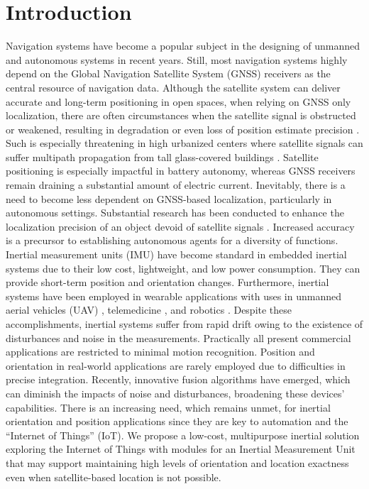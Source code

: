 \section{Introduction}
Navigation systems have become a popular subject in the designing of unmanned and autonomous systems in recent years. Still, most navigation systems highly depend on the Global Navigation Satellite System (GNSS) receivers as the central resource of navigation data. Although the satellite system can deliver accurate and long-term positioning in open spaces, when relying on GNSS only localization, there are often circumstances when the satellite signal is obstructed or weakened, resulting in degradation or even loss of position estimate precision \cite{ioannides2016known}. Such is especially threatening in high urbanized centers where satellite signals can suffer multipath propagation from tall glass-covered buildings \cite{omar2016integration}. Satellite positioning is especially impactful in battery autonomy, whereas GNSS receivers remain draining a substantial amount of electric current. Inevitably, there is a need to become less dependent on GNSS-based localization, particularly in autonomous settings. Substantial research has been conducted to enhance the localization precision of an object devoid of satellite signals \cite{nassar2004improving}\cite{dewhirst2016improving}\cite{kao1991integration}\cite{coyte2013displacement}\cite{wong1988high}. Increased accuracy is a precursor to establishing autonomous agents for a diversity of functions. Inertial measurement units (IMU) have become standard in embedded inertial systems due to their low cost, lightweight, and low power consumption. They can provide short-term position and orientation changes. Furthermore, inertial systems have been employed in wearable applications with uses in unmanned aerial vehicles (UAV) \cite{hetenyi2016sensor}\cite{luo2013uav}\cite{sharma2014sensor}, telemedicine \cite{madgwick2020extended}, and robotics \cite{wilson2019formulation}. Despite these accomplishments, inertial systems suffer from rapid drift owing to the existence of disturbances and noise in the measurements. Practically all present commercial applications are restricted to minimal motion recognition. Position and orientation in real-world applications are rarely employed due to difficulties in precise integration. Recently, innovative fusion algorithms have emerged, which can diminish the impacts of noise and disturbances, broadening these devices' capabilities. There is an increasing need, which remains unmet, for inertial orientation and position applications since they are key to automation and the “Internet of Things” (IoT).
We propose a low-cost, multipurpose inertial solution exploring the Internet of Things with modules for an Inertial Measurement Unit that may support maintaining high levels of orientation and location exactness even when satellite-based location is not possible.

